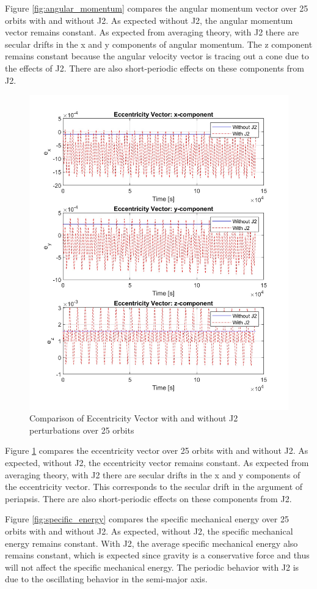 Figure \ref{fig:angular_momentum} compares the angular momentum vector over 25 orbits with and without J2. As expected without J2, the angular momentum vector remains constant. As expected from averaging theory, with J2 there are secular drifts in the x and y components of angular momentum. The z component remains constant because the angular velocity vector is tracing out a cone due to the effects of J2. There are also short-periodic effects on these components from J2.  

\begin{figure}[H]
    \centering
    \includegraphics[width=0.5\linewidth]{PS1/Figures/ecc_J2_comparison.jpg}
    \caption{Comparison of Eccentricity Vector with and without J2 perturbations over 25 orbits}
    \label{fig:eccentricity_vector}
\end{figure}

Figure \ref{fig:eccentricity_vector} compares the eccentricity vector over 25 orbits with and without J2. As expected, without J2, the eccentricity vector remains constant. As expected from averaging theory, with J2 there are secular drifts in the x and y components of the eccentricity vector. This corresponds to the secular drift in the argument of periapsis. There are also short-periodic effects on these components from J2.  


Figure \ref{fig:specific_energy} compares the specific mechanical energy over 25 orbits with and without J2. As expected, without J2, the specific mechanical energy remains constant. With J2, the average specific mechanical energy also remains constant, which is expected since gravity is a conservative force and thus will not affect the specific mechanical energy. The periodic behavior with J2 is due to the oscillating behavior in the semi-major axis. 


